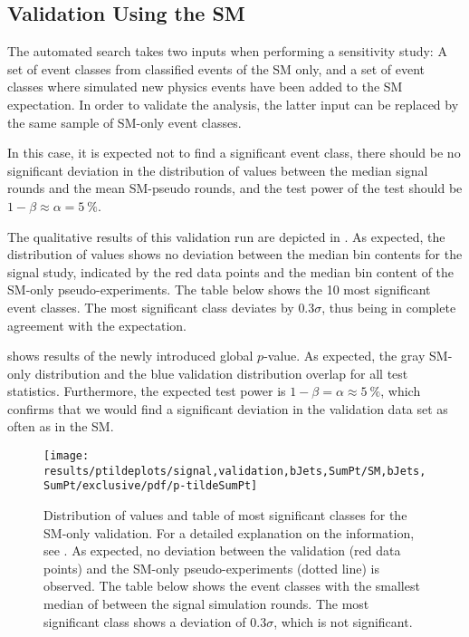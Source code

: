 \subsection{Validation Using the \ac{SM}}
The automated search takes two inputs when performing a sensitivity study: A set of event classes from classified events of the \ac{SM} only, and a set of event classes where simulated new physics events have been added to the \ac{SM} expectation. In order to validate the analysis, the latter input can be replaced by the same sample of \ac{SM}-only event classes. 

In this case, it is expected not to find a significant event class, there should be no significant deviation in the distribution of \ptilde values between the median signal rounds and the mean \ac{SM}-pseudo rounds, and the test power of the \phat test should be $1 - \beta \approx \alpha = \SI{5}{\percent}$.

The qualitative results of this validation run are depicted in . As expected, the distribution of \ptilde values shows no deviation between the median bin contents for the signal study, indicated by the red data points and the median bin content of the \ac{SM}-only pseudo-experiments. The table below shows the \num{10} most significant event classes. The most significant class deviates by $\num{0.3}\sigma$, thus being in complete agreement with the expectation. 

 shows results of the newly introduced global $p$-value. As expected, the gray \ac{SM}-only distribution and the blue validation distribution overlap for all test statistics. Furthermore, the expected test power is $1 - \beta = \alpha \approx \SI{5}{\percent}$, which confirms that we would find a significant deviation in the validation data set as often as in the \ac{SM}.

\begin{figure}
    \centering
    \texttt{[image: results/ptildeplots/signal,validation,bJets,SumPt/SM,bJets,SumPt/exclusive/pdf/p-tildeSumPt]}
    {
        
    }
    \caption{Distribution of \ptilde values and table of most significant classes for the \ac{SM}-only validation. For a detailed explanation on the information, see . As expected, no deviation between the validation (red data points) and the \ac{SM}-only pseudo-experiments (dotted line) is observed. 
    The table below shows the event classes with the smallest median of \ptilde between the signal simulation rounds. The most significant class shows a deviation of $\num{0.3}\sigma$, which is not significant.}
    \label{fig:result_validation_ptilde}
\end{figure}

